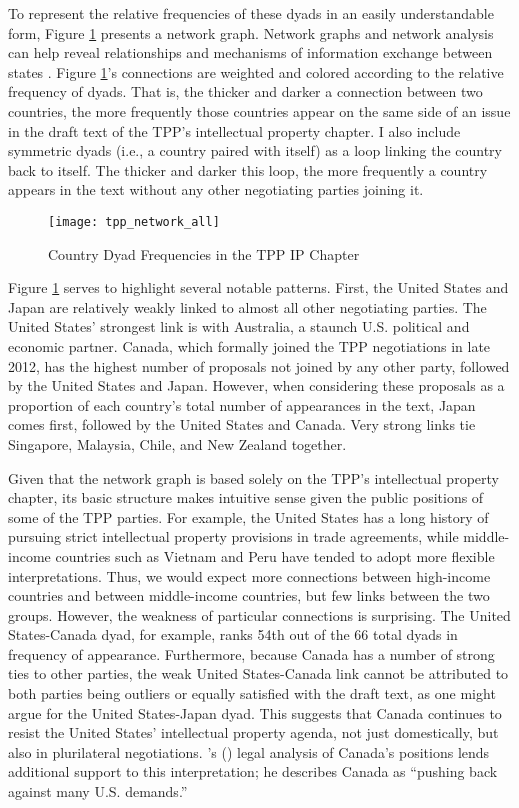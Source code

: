 \documentclass[12pt]{article}
\def\citeapos#1{\citeauthor{#1}'s (\citeyear{#1})} %
\begin{document}
To represent the relative frequencies of these dyads in an easily understandable form, 
Figure \ref{fig_tpp_network_graph} presents a network graph. Network graphs and network analysis can help reveal relationships and mechanisms of information exchange between states \citep{kinne2013network}.
Figure \ref{fig_tpp_network_graph}'s connections are weighted and colored 
according to the relative frequency of dyads. That is, the thicker and darker a connection between 
two countries, the more frequently those countries appear on the same side of an issue in the draft 
text of the TPP's intellectual property chapter. I also include symmetric dyads (i.e., a country paired with itself) as a loop linking the country back to itself. The thicker and darker this loop, the more frequently a country appears in 
the text without any other negotiating parties joining it.

\begin{figure}
\caption{Country Dyad Frequencies in the TPP IP Chapter}
\label{fig_tpp_network_graph}
\centering
\texttt{[image: tpp\_network\_all]}
\end{figure}

Figure \ref{fig_tpp_network_graph} serves to highlight several notable patterns. First, the 
United States and Japan are relatively 
weakly linked to almost all other negotiating parties. The United States' strongest link is with 
Australia, a staunch U.S. political and economic partner. Canada, which formally joined the TPP 
negotiations in late 2012, has the highest number of proposals not joined by any other party, followed 
by the United States and Japan. However, when considering these proposals as a proportion of each 
country's total number of appearances in the text, Japan comes first, followed by the United States 
and Canada. Very strong links tie Singapore, Malaysia, Chile, and New Zealand together.

Given that the network graph is based solely on the TPP's intellectual property chapter, 
its basic structure makes intuitive sense given the public positions of some of the TPP parties. 
For example, the United States has a long history of pursuing strict intellectual property provisions 
in trade agreements, while middle-income countries such as Vietnam and Peru have tended to adopt more 
flexible interpretations. Thus, we would expect more connections between high-income countries and between 
middle-income countries, but few links between the two groups. However, the weakness of particular 
connections is surprising. The United States-Canada dyad, 
for example, ranks 54th out of the 66 total dyads in frequency of appearance. Furthermore, because Canada has a 
number of strong ties to other parties, the weak United States-Canada link cannot be attributed to 
both parties being outliers or equally satisfied with the draft text, as one might argue for the 
United States-Japan dyad. This suggests that Canada continues to resist the United States' intellectual property 
agenda, not just domestically, but also in plurilateral negotiations. \citeapos{michael_geist2013trans} legal analysis of Canada's positions lends additional 
support to this interpretation; he describes Canada as ``pushing back against many U.S. demands.''
\end{document}
